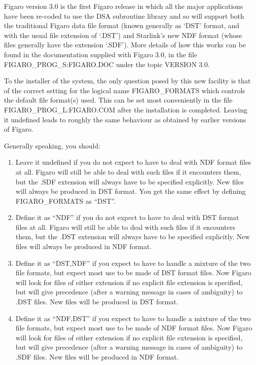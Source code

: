Figaro version 3.0 is the first Figaro release in which all the major
applications have been re-coded to use the DSA subroutine library and so will
support both the traditional Figaro data file format (known generally as `DST'
format, and with the usual file extension of `.DST') and Starlink's new NDF
format (whose files generally have the extension `.SDF'). More details of how
this works can be found in the documentation supplied with Figaro 3.0, in
the file FIGARO\_PROG\_S:FIGARO.DOC under the topic VERSION 3.0.

To the installer of the system, the only question posed by this new facility is
that of the correct setting for the logical name FIGARO\_FORMATS which controls
the default file format(s) used. This can be set most conveniently in the file
FIGARO\_PROG\_L:FIGARO.COM after the installation is completed. Leaving it
undefined leads to roughly the same behaviour as obtained by earlier versions
of Figaro.

Generally speaking, you should:

\begin{enumerate}

\item Leave it undefined if you do not expect to have to deal with NDF format
files at all. Figaro will still be able to deal with such files if it
encounters them, but the .SDF extension will always have to be specified
explicitly. New files will always be produced in DST format. You get the same
effect by defining FIGARO\_FORMATS as ``DST''.

\item Define it as ``NDF'' if you do not expect to have to deal with DST
format files at all. Figaro will still be able to deal with such files if it
encounters them, but the .DST extension will always have to be specified
explicitly. New files will always be produced in NDF format.

\item Define it as ``DST,NDF'' if you expect to have to handle a mixture of
the two file formats, but expect most use to be made of DST format files. Now
Figaro will look for files of either extension if no explicit file extension
is specified, but will give precedence (after a warning message in cases of
ambiguity) to .DST files. New files will be produced in DST format.

\item Define it as ``NDF,DST'' if you expect to have to handle a mixture of
the two file formats, but expect most use to be made of NDF format files. Now
Figaro will look for files of either extension if no explicit file extension
is specified, but will give precedence (after a warning message in cases of
ambiguity) to .SDF files. New files will be produced in NDF format.

\end{enumerate}

